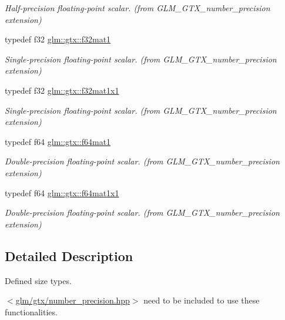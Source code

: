\begin{DoxyCompactItemize}
\begin{DoxyCompactList}\small\item\em Half-\/precision floating-\/point scalar. (from G\+L\+M\+\_\+\+G\+T\+X\+\_\+number\+\_\+precision extension) \end{DoxyCompactList}\item 
\hypertarget{group__gtx__number__precision_gae5ff376ec910c360f06acc0c2b99260c}{}typedef f32 \hyperlink{group__gtx__number__precision_gae5ff376ec910c360f06acc0c2b99260c}{glm\+::gtx\+::f32mat1}\label{group__gtx__number__precision_gae5ff376ec910c360f06acc0c2b99260c}

\begin{DoxyCompactList}\small\item\em Single-\/precision floating-\/point scalar. (from G\+L\+M\+\_\+\+G\+T\+X\+\_\+number\+\_\+precision extension) \end{DoxyCompactList}\item 
\hypertarget{group__gtx__number__precision_ga01caec78388a82a9a22bd45e5751a38a}{}typedef f32 \hyperlink{group__gtx__number__precision_ga01caec78388a82a9a22bd45e5751a38a}{glm\+::gtx\+::f32mat1x1}\label{group__gtx__number__precision_ga01caec78388a82a9a22bd45e5751a38a}

\begin{DoxyCompactList}\small\item\em Single-\/precision floating-\/point scalar. (from G\+L\+M\+\_\+\+G\+T\+X\+\_\+number\+\_\+precision extension) \end{DoxyCompactList}\item 
\hypertarget{group__gtx__number__precision_ga23f8f53c78b50aa07a113c3d07d01bc9}{}typedef f64 \hyperlink{group__gtx__number__precision_ga23f8f53c78b50aa07a113c3d07d01bc9}{glm\+::gtx\+::f64mat1}\label{group__gtx__number__precision_ga23f8f53c78b50aa07a113c3d07d01bc9}

\begin{DoxyCompactList}\small\item\em Double-\/precision floating-\/point scalar. (from G\+L\+M\+\_\+\+G\+T\+X\+\_\+number\+\_\+precision extension) \end{DoxyCompactList}\item 
\hypertarget{group__gtx__number__precision_ga710a5952d78b22635c71c5fc2c0a3319}{}typedef f64 \hyperlink{group__gtx__number__precision_ga710a5952d78b22635c71c5fc2c0a3319}{glm\+::gtx\+::f64mat1x1}\label{group__gtx__number__precision_ga710a5952d78b22635c71c5fc2c0a3319}

\begin{DoxyCompactList}\small\item\em Double-\/precision floating-\/point scalar. (from G\+L\+M\+\_\+\+G\+T\+X\+\_\+number\+\_\+precision extension) \end{DoxyCompactList}\end{DoxyCompactItemize}


\subsection{Detailed Description}
Defined size types. 

$<$\hyperlink{number__precision_8hpp}{glm/gtx/number\+\_\+precision.\+hpp}$>$ need to be included to use these functionalities. 